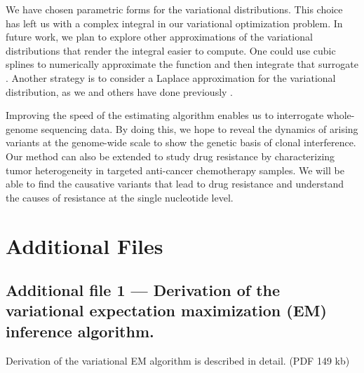 \documentclass{bmcart}
\begin{document}
We have chosen parametric forms for the variational distributions.
This choice has left us with a complex integral in our variational optimization problem.
In future work, we plan to explore other approximations of the variational distributions that render the integral easier to compute.
One could use cubic splines to numerically approximate the function and then integrate that surrogate \cite{mckinley1998cubic}.
Another strategy is to consider a Laplace approximation for the variational distribution, as we and others have done previously \cite{saddiki2014glad, wang2013variational}.


Improving the speed of the estimating algorithm enables us to interrogate whole-genome sequencing data.
By doing this, we hope to reveal the dynamics of arising variants at the genome-wide scale to show the genetic basis of clonal interference.
Our method can also be extended to study drug resistance by characterizing tumor heterogeneity in targeted anti-cancer chemotherapy samples.
We will be able to find the causative variants that lead to drug resistance and understand the causes of resistance at the single nucleotide level.



\section{Additional Files}
  \subsection{Additional file 1 --- Derivation of the variational expectation maximization (EM) inference algorithm.}\label{derivation}
  Derivation of the variational EM algorithm is described in detail. (PDF 149 kb)
\end{document}
